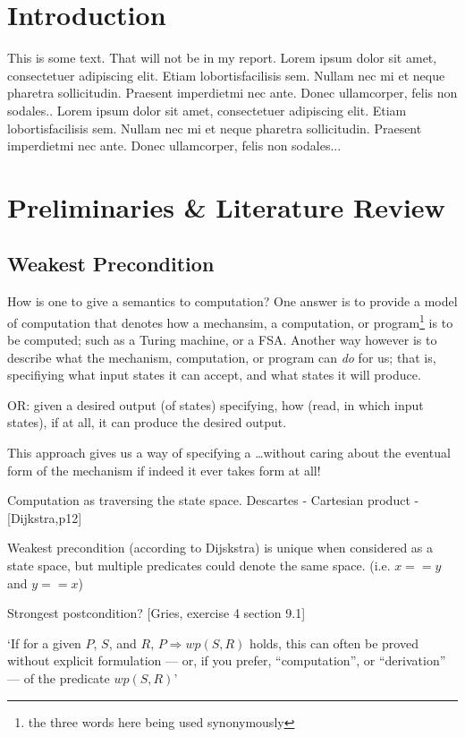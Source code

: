 \documentclass[oneside,12pt]{article}
\begin{document}
\section{Introduction}

This is some text. That will not be in my report. Lorem  ipsum  dolor  sit  amet,  consectetuer  adipiscing  
elit.   Etiam  lobortisfacilisis sem.  Nullam nec mi et 
neque pharetra sollicitudin.  Praesent imperdietmi nec ante. 
Donec ullamcorper, felis non sodales.. Lorem  ipsum  dolor  sit  amet,  consectetuer  adipiscing  
elit.   Etiam  lobortisfacilisis sem.  Nullam nec mi et 
neque pharetra sollicitudin.  Praesent imperdietmi nec ante. 
Donec ullamcorper, felis non sodales...

\section{Preliminaries \& Literature Review}

\subsection{Weakest Precondition}

How is one to give a semantics to computation? One answer is to provide a model of computation that denotes how a mechansim, a computation, or program\footnote{ the three words here being used synonymously} is to be computed; such as a Turing machine, or a FSA. Another way however is to describe what the mechanism, computation, or program can \emph{do} for us; that is, specifiying what input states it can accept, and what states it will produce.


OR: given a desired output (of states) specifying, how (read, in which input states), if at all, it can produce the desired output.

This approach gives us a way of specifying a \ldots without caring about the eventual form of the mechanism if indeed it ever takes form at all!

Computation as traversing the state space. Descartes - Cartesian product - [Dijkstra,p12]


Weakest precondition (according to Dijskstra) is unique when considered as a state space, but multiple predicates could denote the same space. (i.e. $x == y$ and $y == x$)

Strongest postcondition?
[Gries, exercise 4 section 9.1]


`If for a given $P$, $S$, and $R$, $P \Rightarrow wp(S,R)$ holds, this can often be proved without explicit formulation --- or, if you prefer, ``computation'', or ``derivation'' --- of the predicate $wp(S,R)$'
\end{document}
